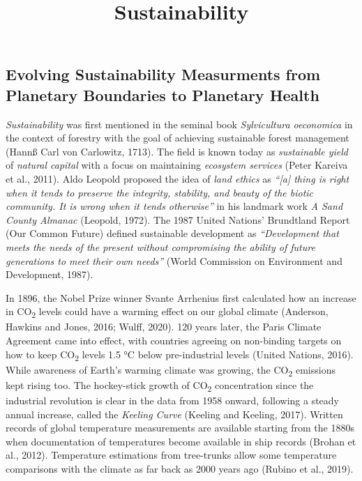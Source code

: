 \documentclass[
  letterpaper,
  DIV=11,
  numbers=noendperiod]{scrartcl}
\title{Sustainability}
\author{}
\date{}
\begin{document}
\maketitle


\subsection{Evolving Sustainability Measurments from Planetary
Boundaries to Planetary
Health}\label{evolving-sustainability-measurments-from-planetary-boundaries-to-planetary-health}

\emph{Sustainability} was first mentioned in the seminal book
\emph{Sylvicultura oeconomica} in the context of forestry with the goal
of achieving sustainable forest management (Hannß Carl von Carlowitz,
1713). The field is known today as \emph{sustainable yield} of
\emph{natural capital} with a focus on maintaining \emph{ecosystem
services} (Peter Kareiva et al., 2011). Aldo Leopold proposed the idea
of \emph{land ethics} as \emph{``{[}a{]} thing is right when it tends to
preserve the integrity, stability, and beauty of the biotic community.
It is wrong when it tends otherwise''} in his landmark work \emph{A Sand
County Almanac} (Leopold, 1972). The 1987 United Nations' Brundtland
Report (Our Common Future) defined sustainable development as
\emph{``Development that meets the needs of the present without
compromising the ability of future generations to meet their own
needs''} (World Commission on Environment and Development, 1987).

In 1896, the Nobel Prize winner Svante Arrhenius first calculated how an
increase in CO\textsubscript{2} levels could have a warming effect on
our global climate (Anderson, Hawkins and Jones, 2016; Wulff, 2020). 120
years later, the Paris Climate Agreement came into effect, with
countries agreeing on non-binding targets on how to keep
CO\textsubscript{2} levels 1.5 °C below pre-industrial levels (United
Nations, 2016). While awareness of Earth's warming climate was growing,
the CO\textsubscript{2} emissions kept rising too. The hockey-stick
growth of CO\textsubscript{2} concentration since the industrial
revolution is clear in the data from 1958 onward, following a steady
annual increase, called the \emph{Keeling Curve} (Keeling and Keeling,
2017). Written records of global temperature measurements are available
starting from the 1880s when documentation of temperatures become
available in ship records (Brohan et al., 2012). Temperature estimations
from tree-trunks allow some temperature comparisons with the climate as
far back as 2000 years ago (Rubino et al., 2019).
\end{document}
